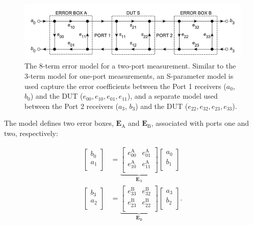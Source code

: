 \documentclass[../thesis/thesis.tex]{subfiles}
\begin{document}
\begin{refsection}
\begin{figure}
	\centering
	\includegraphics[width=\textwidth]{ch2_twoport}
	\caption{The 8-term error model for a two-port measurement. Similar to the 3-term model for one-port measurements, an S-parameter model is used capture the error coefficients between the Port 1 receivers ($a_0$, $b_0$) and the DUT ($e_{00}, e_{10}, e_{01}, e_{11}$), and a separate model used between the Port 2 receivers ($a_3$, $b_3$) and the DUT ($e_{22}, e_{32}, e_{23}, e_{33}$).}
	\label{ch2_fig_twoport}
\end{figure}

The model defines two error boxes, $\mathbf{E}_\textrm{A}$ and $\mathbf{E}_\textrm{B}$, associated with ports one and two, respectively:

\begin{align}
	\begin{bmatrix}
		b_0 \\
		a_1 \\
	\end{bmatrix}
	&=
	\underbrace{
		\begin{bmatrix}
			e^\textrm{A}_{00} & e^\textrm{A}_{01} \\
			e^\textrm{A}_{10} & e^\textrm{A}_{11} \\
		\end{bmatrix}
	}_{\mathbf{E}_\textrm{A}}
	\begin{bmatrix}
		a_0 \\
		b_1 \\
	\end{bmatrix} \\
	\begin{bmatrix}
	b_3 \\
	a_2 \\
	\end{bmatrix}
	&=
	\underbrace{
		\begin{bmatrix}
		e^\textrm{B}_{33} & e^\textrm{B}_{32} \\
		e^\textrm{B}_{23} & e^\textrm{B}_{22} \\
		\end{bmatrix}
	}_{\mathbf{E}_\textrm{B}}
	\begin{bmatrix}
	a_3 \\
	b_2 \\
	\end{bmatrix}.
\end{align}


\end{refsection}
\end{document}
